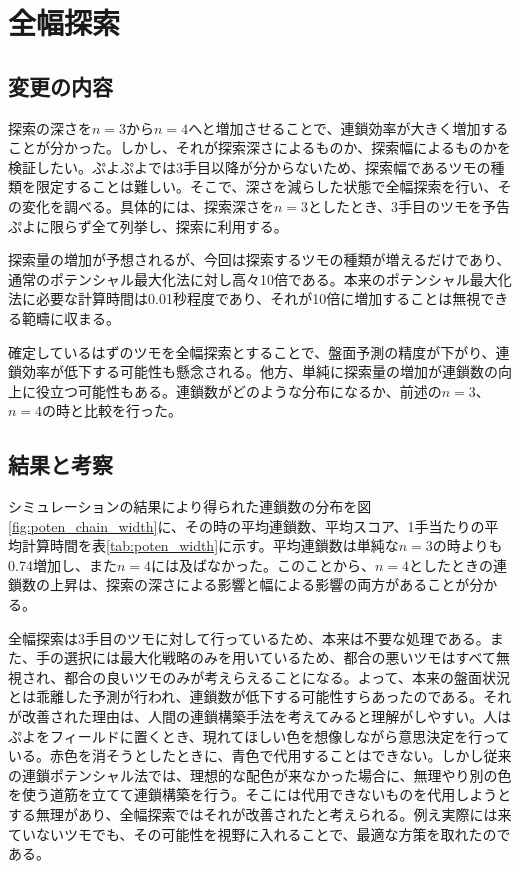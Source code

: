 \documentclass[12pt]{jarticle}
\begin{document}
\section{全幅探索}
\subsection{変更の内容}
探索の深さを$n=3$から$n=4$へと増加させることで、連鎖効率が大きく増加することが分かった。しかし、それが探索深さによるものか、探索幅によるものかを検証したい。ぷよぷよでは3手目以降が分からないため、探索幅であるツモの種類を限定することは難しい。そこで、深さを減らした状態で全幅探索を行い、その変化を調べる。具体的には、探索深さを$n=3$としたとき、3手目のツモを予告ぷよに限らず全て列挙し、探索に利用する。

探索量の増加が予想されるが、今回は探索するツモの種類が増えるだけであり、通常のポテンシャル最大化法に対し高々10倍である。本来のポテンシャル最大化法に必要な計算時間は0.01秒程度であり、それが10倍に増加することは無視できる範疇に収まる。

確定しているはずのツモを全幅探索とすることで、盤面予測の精度が下がり、連鎖効率が低下する可能性も懸念される。他方、単純に探索量の増加が連鎖数の向上に役立つ可能性もある。連鎖数がどのような分布になるか、前述の$n=3$、$n=4$の時と比較を行った。

\subsection{結果と考察}
シミュレーションの結果により得られた連鎖数の分布を図\ref{fig:poten_chain_width}に、その時の平均連鎖数、平均スコア、1手当たりの平均計算時間を表\ref{tab:poten_width}に示す。平均連鎖数は単純な$n=3$の時よりも0.74増加し、また$n=4$には及ばなかった。このことから、$n=4$としたときの連鎖数の上昇は、探索の深さによる影響と幅による影響の両方があることが分かる。

全幅探索は3手目のツモに対して行っているため、本来は不要な処理である。また、手の選択には最大化戦略のみを用いているため、都合の悪いツモはすべて無視され、都合の良いツモのみが考えらえることになる。よって、本来の盤面状況とは乖離した予測が行われ、連鎖数が低下する可能性すらあったのである。それが改善された理由は、人間の連鎖構築手法を考えてみると理解がしやすい。人はぷよをフィールドに置くとき、現れてほしい色を想像しながら意思決定を行っている。赤色を消そうとしたときに、青色で代用することはできない。しかし従来の連鎖ポテンシャル法では、理想的な配色が来なかった場合に、無理やり別の色を使う道筋を立てて連鎖構築を行う。そこには代用できないものを代用しようとする無理があり、全幅探索ではそれが改善されたと考えられる。例え実際には来ていないツモでも、その可能性を視野に入れることで、最適な方策を取れたのである。
\end{document}
